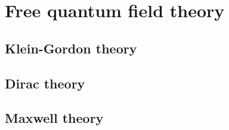 \part{Free quantum field theory}

\chapter{Klein-Gordon theory}
\chapter{Dirac theory}
\chapter{Maxwell theory}